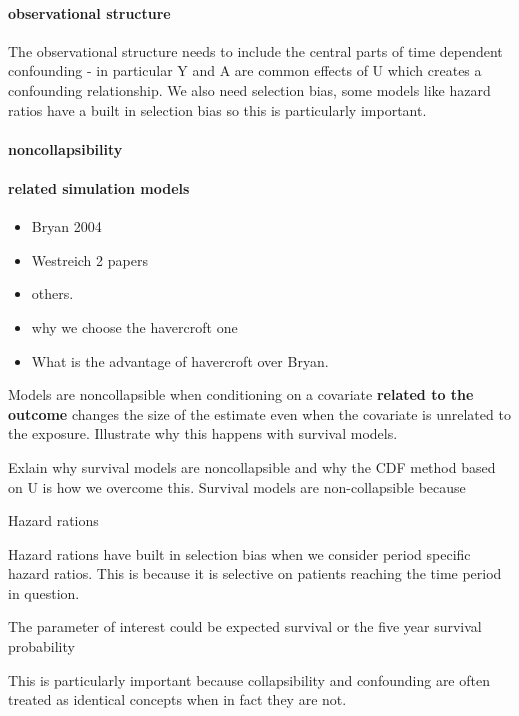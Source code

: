 \documentclass[11pt]{article}
\providecommand{\tightlist}{%
      \setlength{\itemsep}{0pt}\setlength{\parskip}{0pt}}
\begin{document}
\paragraph{observational structure}\label{observational-structure}

The observational structure needs to include the central parts of time
dependent confounding - in particular Y and A are common effects of U
which creates a confounding relationship. We also need selection bias,
some models like hazard ratios have a built in selection bias so this is
particularly important.

\paragraph{noncollapsibility}\label{noncollapsibility}

\paragraph{related simulation models}\label{related-simulation-models}

\begin{itemize}
\tightlist
\item
  Bryan 2004
\item
  Westreich 2 papers
\item
  others.
\item
  why we choose the havercroft one
\item
  What is the advantage of havercroft over Bryan.
\end{itemize}

Models are noncollapsible when conditioning on a covariate
\textbf{related to the outcome} changes the size of the estimate even
when the covariate is unrelated to the exposure. Illustrate why this
happens with survival models.

Exlain why survival models are noncollapsible and why the CDF method
based on U is how we overcome this. Survival models are non-collapsible
because

Hazard rations

Hazard rations have built in selection bias when we consider period
specific hazard ratios. This is because it is selective on patients
reaching the time period in question.

The parameter of interest could be expected survival or the five year
survival probability

This is particularly important because collapsibility and confounding
are often treated as identical concepts when in fact they are not.
\citet{Greenland1999}
\end{document}
